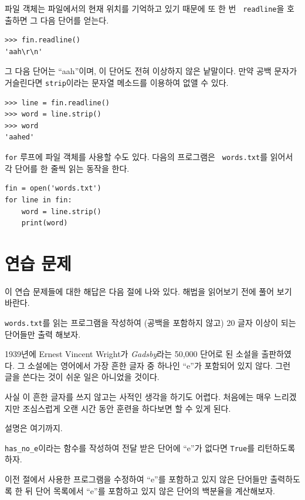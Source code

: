\documentclass[10pt]{book}
\begin{document}
파일 객체는 파일에서의 현재 위치를 기억하고 있기 때문에 또 한 번 {\tt
  readline}을 호출하면 그 다음 단어를 얻는다.

\begin{verbatim}
>>> fin.readline()
'aah\r\n'
\end{verbatim}
%
그 다음 단어는 ``aah''이며, 이 단어도 전혀 이상하지 않은 낱말이다.
만약 공백 문자가 거슬린다면 {\tt strip}이라는 문자열 메소드를 이용하여
없앨 수 있다.

\begin{verbatim}
>>> line = fin.readline()
>>> word = line.strip()
>>> word
'aahed'
\end{verbatim}
%
{\tt for} 루프에 파일 객체를 사용할 수도 있다.  다음의 프로그램은 {\tt
  words.txt}를 읽어서 각 단어를 한 줄씩 읽는 동작을 한다.

\begin{verbatim}
fin = open('words.txt')
for line in fin:
    word = line.strip()
    print(word)
\end{verbatim}
%

\section{연습 문제}

이 연습 문제들에 대한 해답은 다음 절에 나와 있다.  해법을 읽어보기 전에
풀어 보기 바란다.

\begin{exercise} 
  {\tt words.txt}를 읽는 프로그램을 작성하여 (공백을 포함하지 않고) 20
  글자 이상이 되는 단어들만 출력 해보자.

\end{exercise}

\begin{exercise}

  1939년에 Ernest Vincent Wright가 {\em Gadsby}라는 50,000 단어로 된
  소설을 출판하였다.  그 소설에는 영어에서 가장 흔한 글자 중 하나인
  ``e''가 포함되어 있지 않다.  그런 글을 쓴다는 것이 쉬운 일은 아니었을
  것이다.

  사실 이 흔한 글자를 쓰지 않고는 사적인 생각을 하기도 어렵다.
  처음에는 매우 느리겠지만 조심스럽게 오랜 시간 동안 훈련을 하다보면 할
  수 있게 된다.

  설명은 여기까지.

  \verb"has_no_e"이라는 함수를 작성하여 전달 받은 단어에 ``e''가 없다면
  {\tt True}를 리턴하도록 하자.

  이전 절에서 사용한 프로그램을 수정하여 ``e''를 포함하고 있지 않은
  단어들만 출력하도록 한 뒤 단어 목록에서 ``e''를 포함하고 있지 않은
  단어의 백분율을 계산해보자.


\end{exercise}
\end{document}
